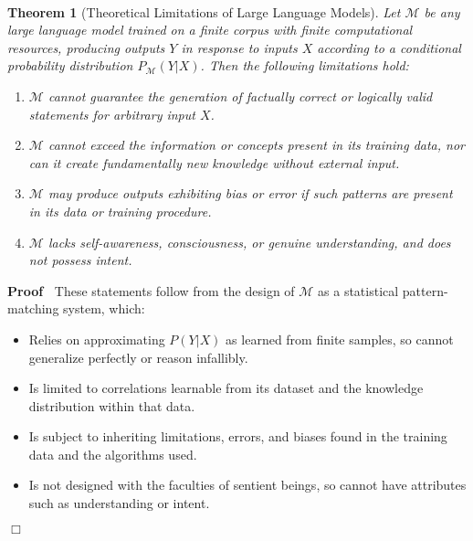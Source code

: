 \documentclass{article}
\newenvironment{proof}{\noindent\textbf{Proof\ }}{\hspace*{\fill}$\Box$\medskip}
\newtheorem{theorem}{Theorem}
\begin{document}
\

\begin{theorem}
  [Theoretical Limitations of Large Language Models] Let $\mathcal{M}$ be any
  large language model trained on a finite corpus with finite computational
  resources, producing outputs $Y$ in response to inputs $X$ according to a
  conditional probability distribution $P_{\mathcal{M}} (Y|X)$. Then the
  following limitations hold:
  \begin{enumerate}
    \item $\mathcal{M}$ cannot guarantee the generation of factually correct
    or logically valid statements for arbitrary input $X$.
    
    \item $\mathcal{M}$ cannot exceed the information or concepts present in
    its training data, nor can it create fundamentally new knowledge without
    external input.
    
    \item $\mathcal{M}$ may produce outputs exhibiting bias or error if such
    patterns are present in its data or training procedure.
    
    \item $\mathcal{M}$ lacks self-awareness, consciousness, or genuine
    understanding, and does not possess intent.
  \end{enumerate}
\end{theorem}

\begin{proof}
  These statements follow from the design of $\mathcal{M}$ as a statistical
  pattern-matching system, which:
  \begin{itemize}
    \item Relies on approximating $P (Y|X)$ as learned from finite samples, so
    cannot generalize perfectly or reason infallibly.
    
    \item Is limited to correlations learnable from its dataset and the
    knowledge distribution within that data.
    
    \item Is subject to inheriting limitations, errors, and biases found in
    the training data and the algorithms used.
    
    \item Is not designed with the faculties of sentient beings, so cannot
    have attributes such as understanding or intent.
  \end{itemize}
\end{proof}
\end{document}
